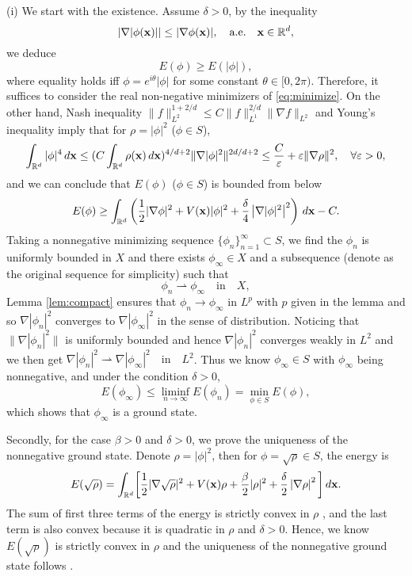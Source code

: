 \documentclass{elsarticle}
\newcommand{\vep}{\varepsilon}
\newcommand{\be}{\begin{equation}}
\newcommand{\ee}{\end{equation}}
\newcommand{\bx}{{\bf x} }
\begin{document}
(i)
We start with the  existence. %
Assume $\delta>0$,
 by the inequality \cite{LiebL}
\be
|\nabla|\phi(\bx)||\leq |\nabla\phi(\bx)|,\quad \text{a.e.}\quad \bx\in\Bbb R^d,
\ee
we deduce
\be
E(\phi)\ge E(|\phi|),
\ee
where equality holds iff $\phi=e^{i\theta}|\phi|$ for some constant $\theta\in[0,2\pi)$. Therefore, it suffices to consider the real non-negative minimizers of
\eqref{eq:minimize}.  On the other hand, Nash inequality $\|f\|_{L^2}^{1+2/d}\leq C\|f\|_{L^1}^{2/d}\|\nabla f\|_{L^2}$ and Young's inequality imply that for $\rho=|\phi|^2$ ($\phi\in S$),
\begin{align*}
\int_{\Bbb R^d}|\phi|^4\,d\bx\leq (C\int_{\Bbb R^d}\rho(\bx)\,d\bx)^{4/d+2}\|\nabla|\phi|^2\|^{2d/d+2}
\leq  \frac{C}{\vep}+\vep\|\nabla\rho\|^2,\quad \forall \vep>0,
\end{align*}
and we can conclude that $E(\phi)$ ($\phi\in S$) is bounded from below
\begin{equation*}
E(\phi)\ge \int_{\Bbb R^d}\left(\frac12|\nabla\phi|^2+V(\bx)|\phi|^2+\frac{\delta}{4}\left|\nabla|\phi|^2\right|^2\right)\,d\bx-C.
\end{equation*}
Taking a nonnegative minimizing sequence $\{\phi_n\}_{n=1}^\infty\subset S$, we find the $\phi_n$ is uniformly bounded in $X$ and  there exists $\phi_\infty \in X$ and a subsequence
(denote as the original sequence for simplicity) such that
\be
\phi_n\rightharpoonup%
 \phi_\infty \quad \text{in}\quad X,
\ee
Lemma \ref{lem:compact} ensures that $\phi_n \to \phi_\infty$ in $L^p$ with $p$ given in the lemma and so $\nabla |\phi_n|^2$ converges to $\nabla|\phi_\infty|^2$ in the sense of distribution.  Noticing that $\|\nabla|\phi_n|^2\|$ is uniformly bounded and hence $\nabla|\phi_n|^2$ converges weakly in $L^2$ and we then get
$\nabla |\phi_n|^2\rightharpoonup
\nabla |\phi_\infty|^2\quad \text{in}\quad L^2$.
 Thus we know $\phi_\infty\in S$ with $\phi_\infty$ being nonnegative, and under the condition $\delta>0$,
\be
E(\phi_\infty)\leq \liminf_{n\to\infty} E(\phi_n)=\min_{\phi\in S} E(\phi),
\ee
which shows that $\phi_\infty$ is a ground state.

Secondly, for the case $\beta>0$ and $\delta>0$, we prove the uniqueness of the nonnegative ground state. Denote $\rho=|\phi|^2$, then for $\phi=\sqrt{\rho}\in S$, the energy is
\be
E(\sqrt{\rho})=\int_{{\mathbb R}^d}\biggl[
\frac12|\nabla\sqrt{\rho}|^2+V(\bx)\rho+\frac{\beta}{2}|\rho|^2+\frac{\delta}{2}\left|\nabla\rho\right|^2\biggl]\,d\bx.
\ee
The sum of first three terms of the energy  is strictly convex in $\rho$ \cite{Lie,Bao2013}, and the last term is also convex because it is  quadratic in $\rho$ and $\delta>0$. Hence,
we know $E(\sqrt{\rho})$ is strictly convex in $\rho$ and the uniqueness of the nonnegative ground state follows \cite{Lie,Bao2013}. %
\end{document}
